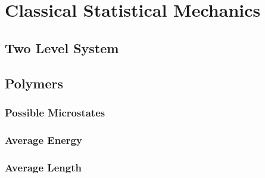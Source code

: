 \documentclass[12pt]{article}
\begin{document}
\section{Classical Statistical Mechanics}

\subsection{Two Level System}

\subsection{Polymers}

\subsubsection{Possible Microstates}

\subsubsection{Average Energy}

\subsubsection{Average Length}
\end{document}
